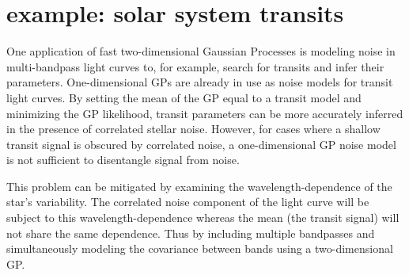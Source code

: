 \documentclass[preprint2]{aastex62}
\newcommand{\todo}[3]{{\color{#2}\emph{#1}: #3}}
\newcommand{\gordontodo}[1]{\todo{Gordon}{red}{#1}}
\begin{document}
	
	
\section{example: solar system transits}
    One application of fast two-dimensional Gaussian Processes is modeling noise in multi-bandpass light 
    curves to, for example, search for transits and infer their parameters. One-dimensional GPs are already in use as 
    noise models for transit light curves. By setting the mean of the GP equal to a transit model and minimizing the GP likelihood, 
    transit parameters can be more accurately inferred in the presence of correlated stellar noise. However, for cases where a shallow 
    transit signal is obscured by correlated noise, a one-dimensional GP noise model is not sufficient to disentangle signal from noise. 
    
    This problem can be mitigated by examining the wavelength-dependence of the star's variability. The correlated noise component 
    of the light curve will be subject to this wavelength-dependence whereas the mean (the transit signal) will not share the same 
    dependence. Thus by including multiple bandpasses and simultaneously modeling the covariance between bands using a two-dimensional 
    GP. 
    
\end{document}
